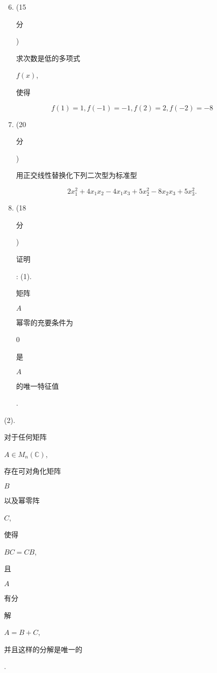 \documentclass[10pt]{article}
\begin{document}
\begin{enumerate}
  \setcounter{enumi}{5}
  \item (15 \begin{CJK}{UTF8}{mj}分\end{CJK}) \begin{CJK}{UTF8}{mj}求次数是低的多项式\end{CJK} $f(x)$, \begin{CJK}{UTF8}{mj}使得\end{CJK}
\end{enumerate}
$$
f(1)=1, f(-1)=-1, f(2)=2, f(-2)=-8
$$

\begin{enumerate}
  \setcounter{enumi}{6}
  \item (20 \begin{CJK}{UTF8}{mj}分\end{CJK}) \begin{CJK}{UTF8}{mj}用正交线性替换化下列二次型为标准型\end{CJK}
\end{enumerate}
$$
2 x_{1}^{2}+4 x_{1} x_{2}-4 x_{1} x_{3}+5 x_{2}^{2}-8 x_{2} x_{3}+5 x_{3}^{2} .
$$

\begin{enumerate}
  \setcounter{enumi}{7}
  \item (18 \begin{CJK}{UTF8}{mj}分\end{CJK}) \begin{CJK}{UTF8}{mj}证明\end{CJK}: (1). \begin{CJK}{UTF8}{mj}矩阵\end{CJK} $A$ \begin{CJK}{UTF8}{mj}幂零的充要条件为\end{CJK} 0 \begin{CJK}{UTF8}{mj}是\end{CJK} $A$ \begin{CJK}{UTF8}{mj}的唯一特征值\end{CJK}.
\end{enumerate}
(2). \begin{CJK}{UTF8}{mj}对于任何矩阵\end{CJK} $A \in M_{n}(\mathbb{C})$, \begin{CJK}{UTF8}{mj}存在可对角化矩阵\end{CJK} $B$ \begin{CJK}{UTF8}{mj}以及幂零阵\end{CJK} $C$, \begin{CJK}{UTF8}{mj}使得\end{CJK} $B C=C B$, \begin{CJK}{UTF8}{mj}且\end{CJK} $A$ \begin{CJK}{UTF8}{mj}有分\end{CJK} \begin{CJK}{UTF8}{mj}解\end{CJK} $A=B+C$, \begin{CJK}{UTF8}{mj}并且这样的分解是唯一的\end{CJK}.
\end{document}
